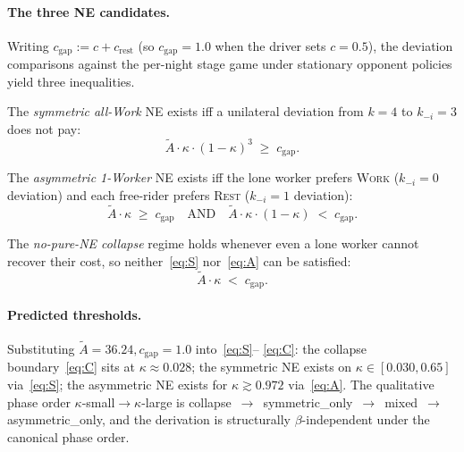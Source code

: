 \documentclass{anvil-paper}
\begin{document}
\paragraph{The three NE candidates.}
Writing $c_{\text{gap}}{:=}c+c_{\text{rest}}$ (so $c_{\text{gap}}{=}1.0$ when
the driver sets $c{=}0.5$), the deviation comparisons against the per-night
stage game under stationary opponent policies yield three inequalities.

The \emph{symmetric all-Work} NE exists iff a unilateral deviation from
$k{=}4$ to $k_{-i}{=}3$ does not pay:
\begin{equation}
  \tilde A\cdot\kappa\cdot(1-\kappa)^{3}\;\geq\;c_{\text{gap}}.
  \tag{S}\label{eq:S}
\end{equation}

The \emph{asymmetric 1-Worker} NE exists iff the lone worker prefers
\textsc{Work} ($k_{-i}{=}0$ deviation) and each free-rider prefers
\textsc{Rest} ($k_{-i}{=}1$ deviation):
\begin{equation}
  \tilde A\cdot\kappa\;\geq\;c_{\text{gap}}
  \quad\text{AND}\quad
  \tilde A\cdot\kappa\cdot(1-\kappa)\;<\;c_{\text{gap}}.
  \tag{A}\label{eq:A}
\end{equation}

The \emph{no-pure-NE collapse} regime holds whenever even a lone worker
cannot recover their cost, so neither~\eqref{eq:S} nor~\eqref{eq:A} can be
satisfied:
\begin{equation}
  \tilde A\cdot\kappa\;<\;c_{\text{gap}}.
  \tag{C}\label{eq:C}
\end{equation}

\paragraph{Predicted thresholds.}
Substituting $\tilde A{=}36.24,c_{\text{gap}}{=}1.0$ into~\eqref{eq:S}--%
\eqref{eq:C}: the collapse boundary~\eqref{eq:C} sits at
$\kappa\approx 0.028$; the symmetric NE exists on
$\kappa\in[0.030,0.65]$ via~\eqref{eq:S}; the asymmetric NE exists for
$\kappa\gtrsim 0.972$ via~\eqref{eq:A}. The qualitative phase order
$\kappa$-small$\to$$\kappa$-large is
\textsf{collapse}~$\to$~\textsf{symmetric\_only}~$\to$~\textsf{mixed}~$\to$~%
\textsf{asymmetric\_only}, and the derivation is structurally
$\beta$-independent under the canonical phase order.
\end{document}
